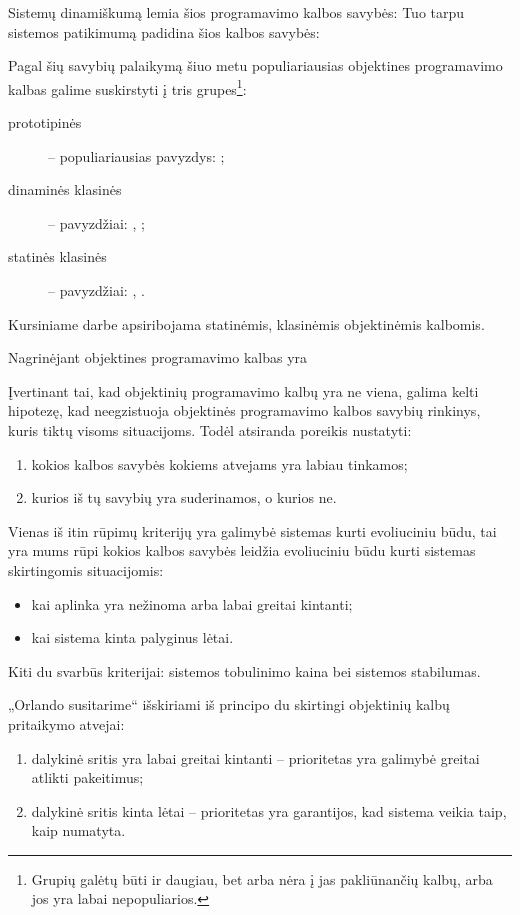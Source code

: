 Sistemų dinamiškumą lemia šios programavimo kalbos savybės:
Tuo tarpu sistemos patikimumą padidina šios kalbos savybės:

Pagal šių savybių palaikymą šiuo metu populiariausias objektines
programavimo kalbas galime suskirstyti į tris grupes\footnote{
Grupių galėtų būti ir daugiau, bet arba nėra į jas pakliūnančių
kalbų, arba jos yra labai nepopuliarios.}:
\begin{description}
  \item[prototipinės] – populiariausias pavyzdys:
    ;
  \item[dinaminės klasinės] – 
    pavyzdžiai: , ;
  \item[statinės klasinės] – 
    pavyzdžiai: , .
\end{description}


Kursiniame darbe apsiribojama statinėmis, klasinėmis objektinėmis
kalbomis.

Nagrinėjant objektines programavimo kalbas yra 

Įvertinant tai, kad objektinių programavimo kalbų yra ne viena,
galima kelti hipotezę, kad neegzistuoja objektinės programavimo
kalbos savybių rinkinys, kuris tiktų visoms situacijoms. Todėl
atsiranda poreikis nustatyti:
\begin{enumerate}
  \item kokios kalbos savybės kokiems atvejams yra labiau tinkamos;
  \item kurios iš tų savybių yra suderinamos, o kurios ne.
\end{enumerate}
Vienas iš itin rūpimų kriterijų yra galimybė sistemas kurti evoliuciniu
būdu, tai yra mums rūpi kokios kalbos savybės leidžia evoliuciniu
būdu kurti sistemas skirtingomis situacijomis:
\begin{itemize}
  \item kai aplinka yra nežinoma arba labai greitai kintanti;
  \item kai sistema kinta palyginus lėtai.
\end{itemize}
Kiti du svarbūs kriterijai: sistemos tobulinimo kaina bei sistemos
stabilumas.

„Orlando susitarime“ išskiriami iš principo du skirtingi objektinių
kalbų pritaikymo atvejai:
\begin{enumerate}
  \item dalykinė sritis yra labai greitai kintanti – prioritetas yra
    galimybė greitai atlikti pakeitimus;
  \item dalykinė sritis kinta lėtai – prioritetas yra garantijos,
    kad sistema veikia taip, kaip numatyta.
\end{enumerate}


